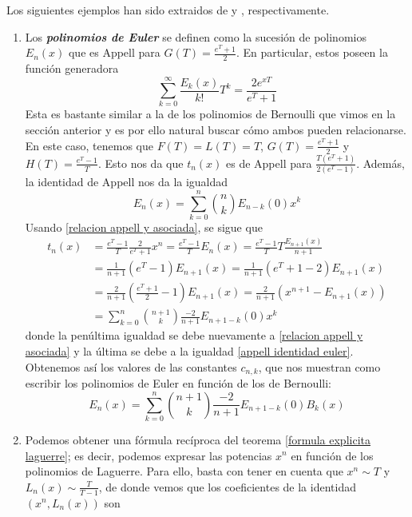 \begin{ej} Los siguientes ejemplos han sido extraidos de \cite{roman1} y \cite{kim3}, respectivamente.
    \begin{enumerate}
        \item Los \textbf{\textit{polinomios de Euler}} se definen como la sucesión de polinomios $E_n(x)$ que es Appell para $G(T) = \frac{e^T +1}{2}$. En particular, estos poseen la función generadora
        \begin{equation*}
            \sum_{k=0}^\infty \frac{E_k(x)}{k!}T^k = \frac{2e^{xT}}{e^T + 1}
        \end{equation*}
        Esta es bastante similar a la de los polinomios de Bernoulli que vimos en la sección anterior y es por ello natural buscar cómo ambos pueden relacionarse. En este caso, tenemos que $F(T) = L(T) = T$, $G(T) = \frac{e^T + 1}{2}$ y $H(T) = \frac{e^T - 1}{T}$. Esto nos da que $t_n(x)$ es de Appell para $\frac{T(e^T + 1)}{2(e^T - 1)}$. Además, la identidad de Appell nos da la igualdad
        \begin{equation}\label{appell identidad euler}
            E_n(x) = \sum_{k=0}^n \binom{n}{k} E_{n-k}(0)x^k
        \end{equation}
        Usando \ref{relacion appell y asociada}, se sigue que
        \begin{align*}
            t_n(x) & =  \frac{e^T - 1}{T}\frac{2}{e^T + 1}x^n = \frac{e^T - 1}{T} E_n(x) = \frac{e^T - 1}{T} T \frac{E_{n+1}(x)}{n+1} \\
            & = \frac{1}{n+1} (e^T - 1)E_{n+1}(x) =  \frac{1}{n+1} (e^T + 1 - 2)E_{n+1}(x) \\
            & = \frac{2}{n+1} (\frac{e^T + 1}{2}- 1)E_{n+1}(x) = \frac{2}{n+1}(x^{n+1} - E_{n+1}(x)) \\
            & = \sum_{k=0}^n \binom{n+1}{k} \frac{-2}{n+1} E_{n+1-k}(0)x^k
        \end{align*}
        donde la penúltima igualdad se debe nuevamente a \ref{relacion appell y asociada} y la última se debe a la igualdad \eqref{appell identidad euler}. Obtenemos así los valores de las constantes $c_{n,k}$, que nos muestran como escribir los polinomios de Euler en función de los de Bernoulli:
        \begin{equation*}
            E_n(x) = \sum_{k=0}^n \binom{n+1}{k} \frac{-2}{n+1} E_{n+1-k}(0)B_k(x)
        \end{equation*}
    \item Podemos obtener una fórmula recíproca del teorema \ref{formula explicita laguerre}; es decir, podemos expresar las potencias $x^n$ en función de los polinomios de Laguerre. Para ello, basta con tener en cuenta que $x^n \sim T$ y $L_n(x) \sim \frac{T}{T-1}$, de donde vemos que los coeficientes de la identidad $(x^n, L_n(x))$ son 

\end{enumerate}
\end{ej}
